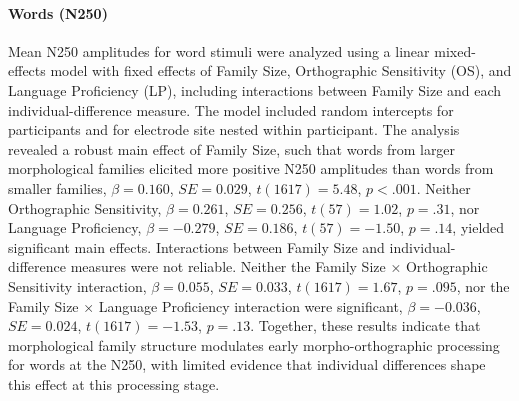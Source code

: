 \documentclass[preprint,12pt, authoryear, review]{elsarticle}
\begin{document}
	\paragraph*{Words (N250)}
	Mean N250 amplitudes for word stimuli were analyzed using a linear mixed-effects model with fixed effects of Family Size, Orthographic Sensitivity (OS), and Language Proficiency (LP), including interactions between Family Size and each individual-difference measure. The model included random intercepts for participants and for electrode site nested within participant. The analysis revealed a robust main effect of Family Size, such that words from larger morphological families elicited more positive N250 amplitudes than words from smaller families, $\beta = 0.160$, $SE = 0.029$, $t(1617) = 5.48$, $p < .001$. Neither Orthographic Sensitivity, $\beta = 0.261$, $SE = 0.256$, $t(57) = 1.02$, $p = .31$, nor Language Proficiency, $\beta = -0.279$, $SE = 0.186$, $t(57) = -1.50$, $p = .14$, yielded significant main effects. Interactions between Family Size and individual-difference measures were not reliable. Neither the Family Size × Orthographic Sensitivity interaction, $\beta = 0.055$, $SE = 0.033$, $t(1617) = 1.67$, $p = .095$, nor the Family Size × Language Proficiency interaction were significant, $\beta = -0.036$, $SE = 0.024$, $t(1617) = -1.53$, $p = .13$. Together, these results indicate that morphological family structure modulates early morpho-orthographic processing for words at the N250, with limited evidence that individual differences shape this effect at this processing stage.
			
\end{document}
